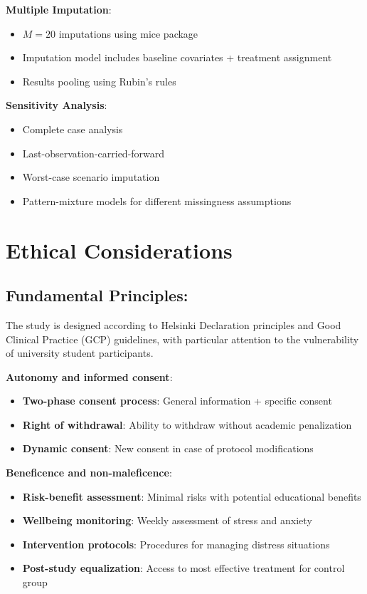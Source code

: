 \textbf{Multiple Imputation}:
\begin{itemize}
    \item $M = 20$ imputations using mice package
    \item Imputation model includes baseline covariates + treatment assignment
    \item Results pooling using Rubin's rules
\end{itemize}

\textbf{Sensitivity Analysis}:
\begin{itemize}
    \item Complete case analysis
    \item Last-observation-carried-forward
    \item Worst-case scenario imputation
    \item Pattern-mixture models for different missingness assumptions
\end{itemize}

\newpage
\section{Ethical Considerations}
\subsection*{Fundamental Principles:}

The study is designed according to Helsinki Declaration principles and Good Clinical Practice (GCP) guidelines, with particular attention to the vulnerability of university student participants.

\textbf{Autonomy and informed consent}:
\begin{itemize}
    \item \textbf{Two-phase consent process}: General information + specific consent
    \item \textbf{Right of withdrawal}: Ability to withdraw without academic penalization
    \item \textbf{Dynamic consent}: New consent in case of protocol modifications
\end{itemize}

\textbf{Beneficence and non-maleficence}:
\begin{itemize}
    \item \textbf{Risk-benefit assessment}: Minimal risks with potential educational benefits
    \item \textbf{Wellbeing monitoring}: Weekly assessment of stress and anxiety
    \item \textbf{Intervention protocols}: Procedures for managing distress situations
    \item \textbf{Post-study equalization}: Access to most effective treatment for control group
\end{itemize}


